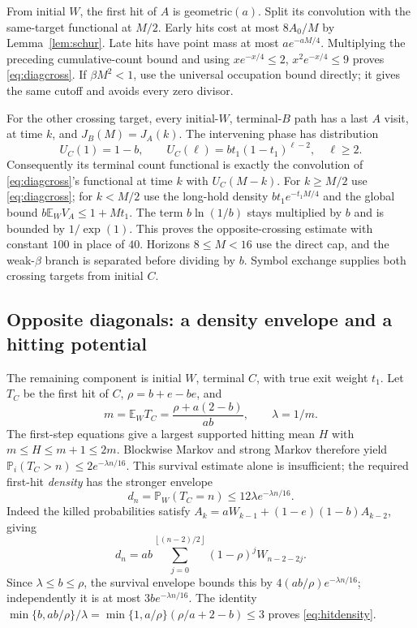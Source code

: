 \documentclass[11pt,letterpaper]{article}
\theoremstyle{definition}\newtheorem{definition}[theorem]{Definition}
\theoremstyle{remark}\newtheorem{remark}[theorem]{Remark}
\newcommand{\E}{\mathbb{E}}
\newcommand{\Prob}{\mathbb{P}}
\newcommand{\floor}[1]{\left\lfloor #1\right\rfloor}
\begin{document}
From initial $W$, the first hit of $A$ is geometric$(a)$. Split its convolution with the same-target functional at $M/2$. Early hits cost at most $8A_0/M$ by Lemma~\ref{lem:schur}. Late hits have point mass at most $ae^{-aM/4}$. Multiplying the preceding cumulative-count bound and using
$x e^{-x/4}\le2$, $x^2e^{-x/4}\le9$
proves \eqref{eq:diagcross}. If $\beta M^2<1$, use the universal occupation bound directly; it gives the same cutoff and avoids every zero divisor.

For the other crossing target, every initial-$W$, terminal-$B$ path has a last $A$ visit, at time $k$, and
$J_B(M)=J_A(k)$. The intervening phase has distribution
\[
 U_C(1)=1-b,\qquad U_C(\ell)=bt_1(1-t_1)^{\ell-2},\quad \ell\ge2.
\]
Consequently its terminal count functional is exactly the convolution of \eqref{eq:diagcross}'s functional at time $k$ with $U_C(M-k)$. For $k\ge M/2$ use \eqref{eq:diagcross}; for $k<M/2$ use the long-hold density
$bt_1e^{-t_1M/4}$ and the global bound
$b\E_WV_A\le1+Mt_1$. The term $b\ln(1/b)$ stays multiplied by $b$ and is bounded by $1/\exp(1)$. This proves the opposite-crossing estimate with constant $100$ in place of $40$. Horizons $8\le M<16$ use the direct cap, and the weak-$\beta$ branch is separated before dividing by $b$. Symbol exchange supplies both crossing targets from initial $C$.

\subsection{Opposite diagonals: a density envelope and a hitting potential}
The remaining component is initial $W$, terminal $C$, with true exit weight $t_1$. Let $T_C$ be the first hit of $C$, $\rho=b+e-be$, and
\[
 m=\E_WT_C=\frac{\rho+a(2-b)}{ab},\qquad \lambda=1/m.
\]
The first-step equations give a largest supported hitting mean $H$ with
$m\le H\le m+1\le2m$. Blockwise Markov and strong Markov therefore yield
$\Prob_i(T_C>n)\le2e^{-\lambda n/16}$.
This survival estimate alone is insufficient; the required first-hit \emph{density} has the stronger envelope
\begin{equation}\label{eq:hitdensity}
 d_n=\Prob_W(T_C=n)\le12\lambda e^{-\lambda n/16}.
\end{equation}
Indeed the killed probabilities satisfy
$A_k=aW_{k-1}+(1-e)(1-b)A_{k-2}$, giving
\[
 d_n=ab\sum_{j=0}^{\floor{(n-2)/2}}(1-\rho)^jW_{n-2-2j}.
\]
Since $\lambda\le b\le\rho$, the survival envelope bounds this by
$4(ab/\rho)e^{-\lambda n/16}$; independently it is at most
$3be^{-\lambda n/16}$. The identity
$\min\{b,ab/\rho\}/\lambda
=\min\{1,a/\rho\}(\rho/a+2-b)\le3$
proves \eqref{eq:hitdensity}.
\end{document}
